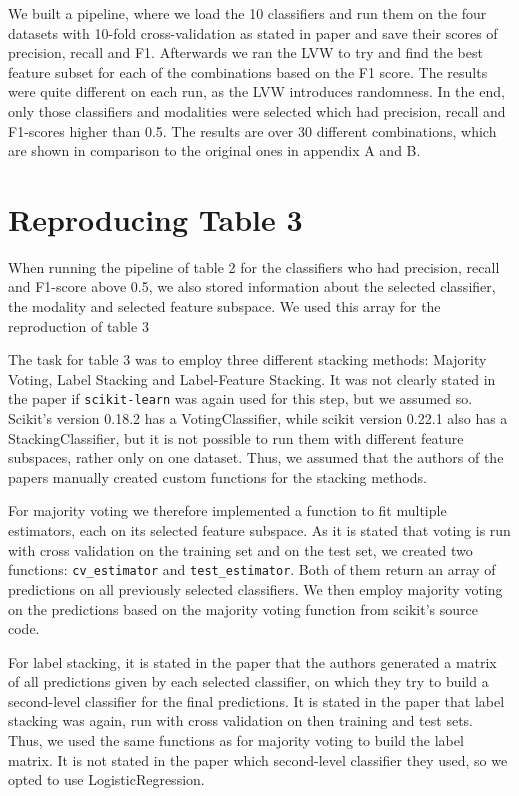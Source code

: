 \documentclass[sigconf]{acmart}
\begin{document}
We built a pipeline, where we load the 10 classifiers and run them on the four datasets with 10-fold cross-validation as stated in paper and save their scores of precision, recall and F1. Afterwards we ran the LVW to try and find the best feature subset for each of the combinations based on the F1 score. The results were quite different on each run, as the LVW introduces randomness. In the end, only those classifiers and modalities were selected which had precision, recall and F1-scores higher than 0.5. The results are over 30 different combinations, which are shown in comparison to the original ones in appendix A and B.

\section{Reproducing Table 3}
When running the pipeline of table 2 for the classifiers who had precision, recall and F1-score above 0.5, we also stored information about the selected classifier, the modality and selected feature subspace. We used this array for the reproduction of table 3

The task for table 3 was to employ three different stacking methods: Majority Voting, Label Stacking and Label-Feature Stacking. It was not clearly stated in the paper if \texttt{scikit-learn} was again used for this step, but we assumed so. Scikit's version 0.18.2 has a VotingClassifier, while scikit version 0.22.1 also has a StackingClassifier, but it is not possible to run them with different feature subspaces, rather only on one dataset. Thus, we assumed that the authors of the papers manually created custom functions for the stacking methods.

For majority voting we therefore implemented a function to fit multiple estimators, each on its selected feature subspace. As it is stated that voting is run with cross validation on the training set and on the test set, we created two functions: \texttt{cv\_estimator} and \texttt{test\_estimator}. Both of them return an array of predictions on all previously selected classifiers. We then employ majority voting on the predictions based on the majority voting function from scikit's source code.

For label stacking, it is stated in the paper that the authors generated a matrix of all predictions given by each selected classifier, on which they try to build a second-level classifier for the final predictions. It is stated in the paper that label stacking was again, run with cross validation on then training and test sets. Thus, we used the same functions as for majority voting to build the label matrix. It is not stated in the paper which second-level classifier they used, so we opted to use LogisticRegression.
\end{document}

